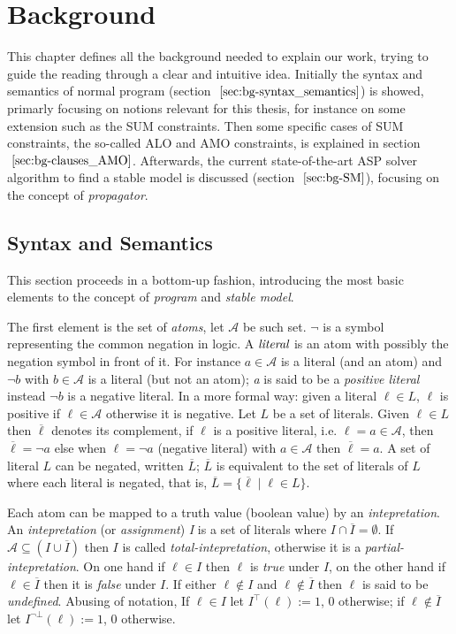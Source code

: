 \chapter{Background}

This chapter defines all the background needed to explain our work,
trying to guide the reading through a clear and intuitive idea.
Initially the syntax and semantics of normal
program (section $~\ref{sec:bg-syntax_semantics}$) is showed,
primarly focusing on notions relevant for this thesis, for instance on some
extension such as the SUM constraints.
Then some specific cases of SUM constraints, the so-called ALO and AMO constraints, 
is explained in section $~\eqref{sec:bg-clauses_AMO}$.
Afterwards, the current state-of-the-art ASP solver algorithm to find a stable model 
is discussed (section $~\ref{sec:bg-SM}$), focusing on the concept of \textit{propagator}.

\section{Syntax and Semantics}
\label{sec:bg-syntax_semantics}

This section proceeds in a bottom-up fashion, introducing the 
most basic elements to the concept of \textit{program}
and \textit{stable model}.

The first element is the set of \textit{atoms}, let $\mathcal{A}$ be such set.
$\neg$ is a symbol representing the common negation in logic.
A $\emph{literal}$ is an atom with possibly the negation symbol in front of it.
For instance $a \in \mathcal{A}$ is a literal (and an atom) and $\neg b$ with $b \in \mathcal{A}$
is a literal (but not an atom); \textit{a} is said to be a \textit{positive literal} instead
$\neg b$ is a negative literal. In a more formal way: given a literal $\ell \in L$, $\ell$ is 
positive if $\ell \in \mathcal{A}$ otherwise it is negative. Let $L$ be a set of literals.
Given $\ell \in L$ then $\overline{\ell}$ denotes its complement, if $\ell$ is a positive
literal, i.e. $\ell = a \in \mathcal{A}$, then $\overline{\ell} = \neg a$ else 
when $\ell = \neg a$ (negative literal) with $a \in \mathcal{A}$ then $\overline{\ell} = a$.
A set of literal $L$ can be negated, written $\overline{L}$;
$\overline{L}$ is equivalent to the set of literals of $L$ where each literal is negated,
that is, $\overline{L} = \{ \overline{\ell} \mid \ell \in L \}$.

Each atom can be mapped to a truth value (boolean value) by an \textit{intepretation}.
An \textit{intepretation} (or \textit{assignment}) \textit{I} is a set of 
literals where $I \cap \overline{I} = \emptyset$.
If $\mathcal{A} \subseteq (I \cup \overline{I})$ then $I$ is called \textit{total-intepretation},
otherwise it is a \textit{partial-intepretation}.
On one hand if $\ell \in I$ then $\ell$ is \textit{true} under $I$, on the other hand 
if $\ell \in \overline{I}$ then it is \textit{false} under $I$.
If either $\ell \not\in I$ and $\ell \not\in \overline{I}$ then $\ell$ is said to be \textit{undefined}. 
Abusing of notation, If $\ell \in I$ let $I^{\top}(\ell) := 1$, 0 otherwise;
if $\ell \not\in \overline{I}$ let $I^{\neg\bot}(\ell) := 1$, 0 otherwise.

